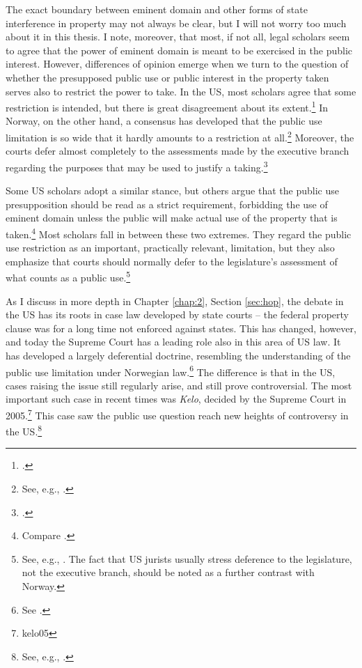 The exact boundary between eminent domain and other forms of state interference in property may not always be clear, but I will not worry too much about it in this thesis. I note, moreover, that most, if not all, legal scholars seem to agree that the power of eminent domain is meant to be exercised in the public interest. However, differences of opinion emerge when we turn to the question of whether the presupposed public use or public interest in the property taken serves also to restrict the power to take. In the US, most scholars agree that some restriction is intended, but there is great disagreement about its extent.\footcite[205]{berger78} In Norway, on the other hand, a consensus has developed that the public use limitation is so wide that it hardly amounts to a restriction at all.\footnote{See, e.g., \cite[368]{aall10}.} Moreover, the courts defer almost completely to the assessments made by the executive branch regarding the purposes that may be used to justify a taking.\footcite[368]{aall10}

Some US scholars adopt a similar stance, but others argue that the public use presupposition should be read as a strict requirement, forbidding the use of eminent domain unless the public will make actual use of the property that is taken.\footnote{Compare \cite{bell06,bell09,claeys04,sandefur06}.} Most scholars fall in between these two extremes. They regard the public use restriction as an important, practically relevant, limitation, but they also emphasize that courts should normally defer to the legislature's assessment of what counts as a public use.\footnote{See, e.g., \cite{merrill86,alexander05}. The fact that US jurists usually stress deference to the legislature, not the executive branch, should be noted as a further contrast with Norway.}

As I discuss in more depth in Chapter \ref{chap:2}, Section \ref{sec:hop}, the debate in the US has its roots in case law developed by state courts -- the federal property clause was for a long time not enforced against states. This has changed, however, and today the Supreme Court has a leading role also in this area of US law. It has developed a largely deferential doctrine, resembling the understanding of the public use limitation under Norwegian law.\footnote{See \cite{berman54,midkiff84,kelo05}.} The difference is that in the US, cases raising the issue  still regularly arise, and still prove controversial. The most important such case in recent times was {\it Kelo}, decided by the Supreme Court in 2005.\footnote{kelo05} This case saw the public use question reach new heights of controversy in the US.\footnote{See, e.g., \cite{somin09}.}

